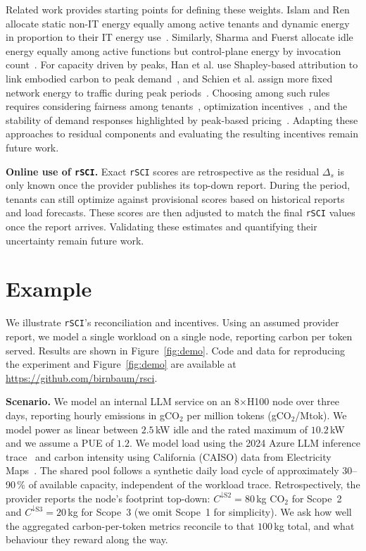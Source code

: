 \documentclass[sigconf,screen,nonacm]{acmart}
\newcommand{\parag}[1]{\vspace{2mm}\noindent\textbf{#1.}\hspace{2mm}}
\newcommand{\RSCI}{\texttt{rSCI}\xspace}
\begin{document}
Related work provides starting points for defining these weights.
Islam and Ren allocate static non-IT energy equally among active tenants and dynamic energy in proportion to their IT energy use~\cite{islam2016energyaccounting}.
Similarly, Sharma and Fuerst allocate idle energy equally among active functions but control-plane energy by invocation count~\cite{sharma2024accountable_footprint_serverless,sharma2025disaggregation}.
For capacity driven by peaks, Han et al. use Shapley-based attribution to link embodied carbon to peak demand~\cite{han2024gametheoretic,han2025fairco2}, and Schien et al. assign more fixed network energy to traffic during peak periods~\cite{schien2025causal}.
Choosing among such rules requires considering fairness among tenants~\cite{westerhof2023allocation,montoyafranco2025fairwatt}, optimization incentives~\cite{li2025llmserving}, and the stability of demand responses highlighted by peak-based pricing~\cite{nasiriani2016peakpricing}.
Adapting these approaches to residual components and evaluating the resulting incentives remain future work.

\parag{Online use of \RSCI}
Exact \RSCI scores are retrospective as the residual $\Delta_s$ is only known once the provider publishes its top-down report.
During the period, tenants can still optimize against provisional scores based on historical reports and load forecasts.
These scores are then adjusted to match the final \RSCI values once the report arrives.
Validating these estimates and quantifying their uncertainty remain future work.

\section{Example}
\label{sec:demo}

We illustrate \RSCI's reconciliation and incentives.
Using an assumed provider report, we model a single workload on a single node, reporting carbon per token served. Results are shown in Figure~\ref{fig:demo}.
Code and data for reproducing the experiment and Figure~\ref{fig:demo} are available at \url{https://github.com/birnbaum/rsci}.

\parag{Scenario}
We model an internal LLM service on an 8$\times$H100 node over three days, reporting hourly emissions in gCO$_2$ per million tokens (gCO$_2$/Mtok).
We model power as linear between $2.5$\,kW idle and the rated maximum of $10.2$\,kW~\cite{nvidia-dgx-h100-datasheet} and we assume a PUE of $1.2$.
We model load using the 2024 Azure LLM inference trace~\cite{stojkovic2025dynamollm} and carbon intensity using California (CAISO) data from Electricity Maps~\cite{electricitymaps2026}.
The shared pool follows a synthetic daily load cycle of approximately 30--90\,\% of available capacity, independent of the workload trace.
Retrospectively, the provider reports the node's footprint top-down: $C^{\downarrow\text{S2}}\!=\!80$\,kg CO$_2$ for Scope~2 and $C^{\downarrow\text{S3}}\!=\!20$\,kg for Scope~3 (we omit Scope~1 for simplicity).
We ask how well the aggregated carbon-per-token metrics reconcile to that $100$\,kg total, and what behaviour they reward along the way.
\end{document}
